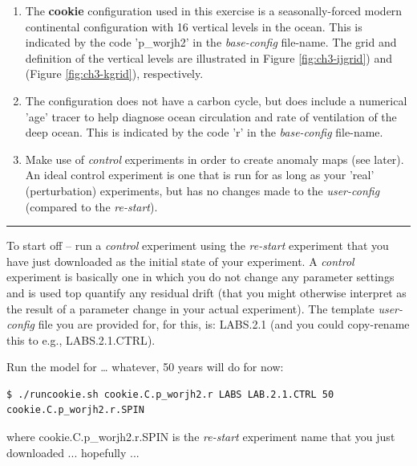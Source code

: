 \begin{enumerate}[noitemsep]
\vspace{1mm}
\item The \textbf{cookie} configuration used in this exercise is a seasonally-forced modern continental configuration with 16 vertical levels in the ocean. This is indicated by the code '\textsf{\footnotesize p\_worjh2}' in the \textit{base-config} file-name. The grid and definition of the vertical levels are illustrated in Figure \ref{fig:ch3-ijgrid}) and (Figure \ref{fig:ch3-kgrid}), respectively.
\vspace{1mm}
\item The configuration does not have a carbon cycle, but does include a numerical 'age' tracer to help diagnose ocean circulation and rate of ventilation of the deep ocean. This is indicated by the code '\textsf{\footnotesize r}' in the \textit{base-config} file-name.
\vspace{1mm}
\item Make use of \textit{control} experiments in order to create anomaly maps (see later). An ideal control experiment is one that is run for as long as your 'real' (perturbation) experiments, but has no changes made to the \textit{user-config} (compared to the \textit{re-start}).
\end{enumerate}

\vspace{1mm}\noindent\rule{4cm}{0.5pt}\vspace{2mm}

\noindent To start off -- run a \textit{control} experiment using the \textit{re-start} experiment that you have just downloaded as the initial state of your experiment. A \textit{control} experiment is basically one in which you do not change any parameter settings and is used top quantify any residual drift (that you might otherwise interpret as the result of a parameter change in your actual experiment). The template \textit{user-config} file you are provided for, for this, is: \textsf{\footnotesize LABS.2.1} (and you could copy-rename this to e.g., \textsf{\footnotesize LABS.2.1.CTRL}).

\vspace{1mm}
Run the model for … whatever, 50 years will do for now:

\vspace{-2mm}\small\begin{verbatim}
$ ./runcookie.sh cookie.C.p_worjh2.r LABS LAB.2.1.CTRL 50 cookie.C.p_worjh2.r.SPIN
\end{verbatim}\normalsize\vspace{-2mm}
where \textsf{\footnotesize cookie.C.p\_worjh2.r.SPIN} is the \textit{re-start} experiment name that you just downloaded ... hopefully ...


